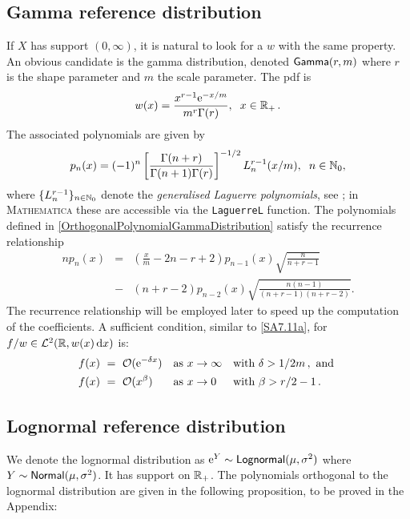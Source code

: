 \subsection{Gamma reference distribution}\label{SS:GammaNu}
If $X$ has support $(0,\infty)$, it is natural to look for a $w$ with the same property.
An obvious candidate is the gamma distribution, denoted $\mathsf{Gamma}(r,m)$ where $r$ is the shape parameter
and $m$ the scale parameter. The pdf is
\begin{equation} \label{GammaPDF}
w(x)=\frac{x^{r-1} \mathrm{e}^{-x/m}}{m^{r}\Gamma(r)},\hspace{0.2cm}x\in \mathbb{R}_+ \,.
\end{equation}
The associated polynomials are given by
\begin{equation} \label{OrthogonalPolynomialGammaDistribution}
p_{n}(x)=(-1)^{n}\left[\frac{\Gamma(n+r)}{\Gamma(n+1)\Gamma(r)}\right]^{-1/2}L_{n}^{r-1}(x/m),\hspace{0.2cm} n\in\mathbb{N}_0,
\end{equation}
where $\{L^{r-1}_{n}\}_{n\in\mathbb{N}_0}$ denote the \emph{generalised Laguerre polynomials}, see \cite{Szegoe1939}; in \textsc{Mathematica} these are accessible via the \texttt{LaguerreL} function.
The polynomials defined in \eqref{OrthogonalPolynomialGammaDistribution} satisfy the recurrence relationship
\begin{eqnarray} \label{OrthogonalPolynomialGammaDistributionRecurreceRelationship}
np_{n}(x)&=&\left(\frac{x}{m}-2n-r+2\right)p_{n-1}(x)\sqrt{\frac{n}{n+r-1}}\nonumber\\
&-&(n+r-2)p_{n-2}(x)\sqrt{\frac{n(n-1)}{(n+r-1)(n+r-2)}}.
\end{eqnarray}
The recurrence relationship will be employed later to speed up the computation of the coefficients.
A sufficient condition, similar to \eqref{SA7.11a}, for $f/w\in\mathcal{L}^2(\mathbb{R}, w(x) \mathop{}\!\mathrm{d} x)$ is:
\begin{equation} \label{SA7.11b}
\begin{alignedat}{4}
f(x)\ &=\ {\mathcal{O}}(\mathrm{e}^{ -\delta x }) \quad &&\text{as } x\to\infty \quad && \text{with } \delta>1/2m\,, \text{ and }\\
f(x)\ &=\ {\mathcal{O}}(x^\beta) \quad &&\text{as } x\to 0 \quad && \text{with } \beta>r/2-1\,.
\end{alignedat}
\end{equation}

\subsection{Lognormal reference distribution}\label{SS:LogNNu}
We denote the lognormal distribution as $\mathrm{e}^Y \sim \mathsf{Lognormal}(\mu, \sigma^2)$ where $Y \sim \mathsf{Normal}(\mu, \sigma^2)$. It has support on $\mathbb{R}_+$. The polynomials orthogonal to the lognormal distribution are given in the following proposition, to be proved in the Appendix:

